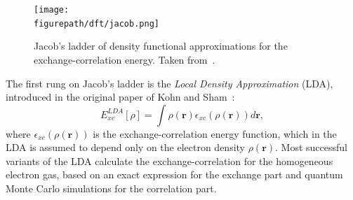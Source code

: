 \begin{refsection}
\begin{figure}[ht]
\centering 
\texttt{[image: \\figurepath/dft/jacob.png]} 
\caption{Jacob's ladder of density functional approximations for the 
exchange-correlation energy. Taken from~\cite{Wang2014}.} 
\label{dft:fig-jacob} 
\end{figure} 
 
The first rung on Jacob's ladder is the \textit{Local Density Approximation} 
(LDA), introduced in the original paper of Kohn and Sham~\cite{Kohn1965}: 
\begin{equation} 
E_{xc}^{LDA}[\rho] = \int \rho(\mathbf{r}) 
\epsilon_{xc}(\rho(\mathbf{r}))d\mathbf{r}, 
\end{equation} 
where $\epsilon_{xc}(\rho(\mathbf{r}))$ is the exchange-correlation energy 
function, which in the LDA is assumed to depend only on the electron density 
$\rho(\mathbf{r})$. Most successful variants of the LDA calculate the 
exchange-correlation for the homogeneous electron gas, based on an exact 
expression for the exchange part and quantum Monte Carlo simulations for the 
correlation part. 
 

\end{refsection}
